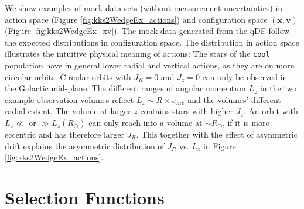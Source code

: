 \documentclass[iop,revtex4,numberedappendix,appendixfloats]{emulateapj}
\newcommand{\vect}[1]{\boldsymbol{#1}}
\begin{document}
We show examples of mock data sets (without measurement uncertainties) in action space (Figure \ref{fig:kks2WedgeEx_actions}) and configuration space $(\vect{x},\vect{v})$ (Figure \ref{fig:kks2WedgeEx_xv}). The mock data generated from the qDF follow the expected distributions in configuration space. The distribution in action space illustrates the intuitive physical meaning of actions: The stars of the \texttt{cool} population have in general lower radial and vertical actions, as they are on more circular orbits. Circular orbits with $J_R = 0$ and $J_z = 0$ can only be observed in the Galactic mid-plane. The different ranges of angular momentum $L_z$ in the two example observation volumes reflect $L_z \sim R \times v_\text{circ}$ and the volumes' different radial extent. The volume at larger $z$ contains stars with higher $J_z$. An orbit with $L_z \ll$ or $\gg L_z(R_\odot)$ can only reach into a volume at $\sim R_\odot$, if it is more eccentric and has therefore larger $J_R$. This together with the effect of asymmetric drift explains the asymmetric distribution of $J_R$ vs. $L_z$ in Figure \ref{fig:kks2WedgeEx_actions}.

\section{Selection Functions} \label{app:selectionfunction}
\end{document}
